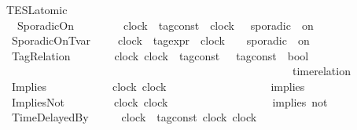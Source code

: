\begin{isabellebody}
\ {\isacharprime}{\isasymtau}\ TESL{\isacharunderscore}atomic\ {\isacharequal}\isanewline
\ \ \ \ SporadicOn\ \ \ \ \ \ \ \ \ {\isacartoucheopen}clock{\isacartoucheclose}\ {\isacartoucheopen}{\isacharprime}{\isasymtau}\ tag{\isacharunderscore}const{\isacartoucheclose}\ \ {\isacartoucheopen}clock{\isacartoucheclose}\ \ {\isacharparenleft}{\isacartoucheopen}{\isacharunderscore}\ sporadic\ {\isacharunderscore}\ on\ {\isacharunderscore}{\isacartoucheclose}\ {}{}{\isacharparenright}\isanewline
\ \ {\isacharbar}\ SporadicOnTvar\ \ \ \ \ {\isacartoucheopen}clock{\isacartoucheclose}\ {\isacartoucheopen}{\isacharprime}{\isasymtau}\ tag{\isacharunderscore}expr{\isacartoucheclose}\ \ {\isacartoucheopen}clock{\isacartoucheclose}\ \ \ {\isacharparenleft}{\isacartoucheopen}{\isacharunderscore}\ sporadic{\isasymsharp}\ {\isacharunderscore}\ on\ {\isacharunderscore}{\isacartoucheclose}\ {}{}{\isacharparenright}\ \isanewline
\ \ {\isacharbar}\ TagRelation\ \ \ \ \ \ \ \ {\isacartoucheopen}clock{\isacartoucheclose}\ {\isacartoucheopen}clock{\isacartoucheclose}\ {\isacartoucheopen}{\isacharparenleft}{\isacharprime}{\isasymtau}\ tag{\isacharunderscore}const\ {\isasymtimes}\ {\isacharprime}{\isasymtau}\ tag{\isacharunderscore}const{\isacharparenright}\ {\isasymRightarrow}\ bool{\isacartoucheclose}\ \isanewline
\ \ \ \ \ \ \ \ \ \ \ \ \ \ \ \ \ \ \ \ \ \ \ \ \ \ \ \ \ \ \ \ \ \ \ \ \ \ \ \ \ \ \ \ \ \ \ \ \ \ \ \ \ \ {\isacharparenleft}{\isacartoucheopen}time{\isacharminus}relation\ {\isasymlfloor}{\isacharunderscore}{\isacharcomma}\ {\isacharunderscore}{\isasymrfloor}\ {\isasymin}\ {\isacharunderscore}{\isacartoucheclose}\ {}{}{\isacharparenright}\isanewline
\ \ {\isacharbar}\ Implies\ \ \ \ \ \ \ \ \ \ \ \ {\isacartoucheopen}clock{\isacartoucheclose}\ {\isacartoucheopen}clock{\isacartoucheclose}\ \ \ \ \ \ \ \ \ \ \ \ \ \ \ \ \ \ {\isacharparenleft}\ {\isacartoucheopen}implies{\isacartoucheclose}\ {}{}{\isacharparenright}\isanewline
\ \ {\isacharbar}\ ImpliesNot\ \ \ \ \ \ \ \ \ {\isacartoucheopen}clock{\isacartoucheclose}\ {\isacartoucheopen}clock{\isacartoucheclose}\ \ \ \ \ \ \ \ \ \ \ \ \ \ \ \ \ \ {\isacharparenleft}\ {\isacartoucheopen}implies\ not{\isacartoucheclose}\ {}{}{\isacharparenright}\isanewline
\ \ {\isacharbar}\ TimeDelayedBy\ \ \ \ \ \ {\isacartoucheopen}clock{\isacartoucheclose}\ {\isacartoucheopen}{\isacharprime}{\isasymtau}\ tag{\isacharunderscore}const{\isacartoucheclose}\ {\isacartoucheopen}clock{\isacartoucheclose}\ {\isacartoucheopen}clock{\isacartoucheclose}\ \isanewline

\end{isabellebody}
